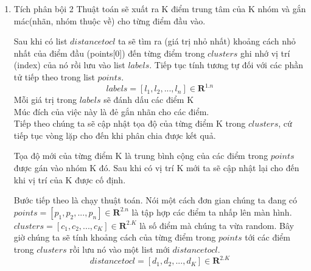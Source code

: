 \documentclass[15pt,a4paper]{report}
\begin{document}
{\begin{center}
\begin{enumerate}
\begin{itemize}
                Nếu không xác đinh thì không phải cực trị.
            \end{itemize}
        \item Tích phân bội 2
            Thuật toán sẽ xuất ra K điểm trung tâm  của K nhóm và gắn mác(nhãn, nhóm thuộc về) cho từng điểm đầu vào.
            
            Sau khi có list $distancetocl$ ta sẽ tìm ra (giá trị nhỏ nhất) khoảng cách nhỏ nhất của điểm đầu (points[0]) đến từng điểm trong $clusters$ ghi nhớ vị trí (index) của nó rồi lưu vào list $labels$. Tiếp tục tính tương tự đối với các phần tử tiếp theo trong list $points$. \\ 
            \[labels = [l_{1}, l_{2}, ..., l_{n}] \in \mathbf{R} ^{1.n}\]
            Mỗi giá trị trong $labels$ sẽ đánh dấu các điểm K \\
            Múc đích của việc này là đẻ gắn nhãn cho các điểm. \\
            

            Tiếp theo chúng ta sẽ cập nhật tọa độ của từng điểm K trong $clusters$, cứ tiếp tục vòng lặp cho đến khi phân chia được kết quả.


            Tọa độ mới của từng điểm K là trung bình cộng của các điểm trong $points$ được gán vào nhóm K đó. Sau khi có vị trí K mới ta sẽ cập nhật lại cho đến khi vị trí của K được cố định.




Bước tiếp theo là chạy thuật toán. Nói một cách đơn gian chúng ta đang có $points = [p_{1}, p_{2}, ..., p_{n}] \in  \mathbf{R} ^{2.n}$ là tập hợp các điểm ta nhấp lên màn hình. $clusters = [c_{1}, c_{2}, ... , c_{K}] \in \mathbf{R}^{2.K} $ là số  điểm mà chúng ta vừa random. Bây giờ chúng ta sẽ tính khoảng cách của từng điểm trong $points$ tới các điểm trong $clusters$ rồi lưu nó vào một list mới $distancetocl$. \[distancetocl = \left[d_{1}, d_{2}, ..., d_{K}\right] \in \mathbf{R}^{2.K}\]

           
    \end{enumerate}
    
\end{center}

}
\end{document}
